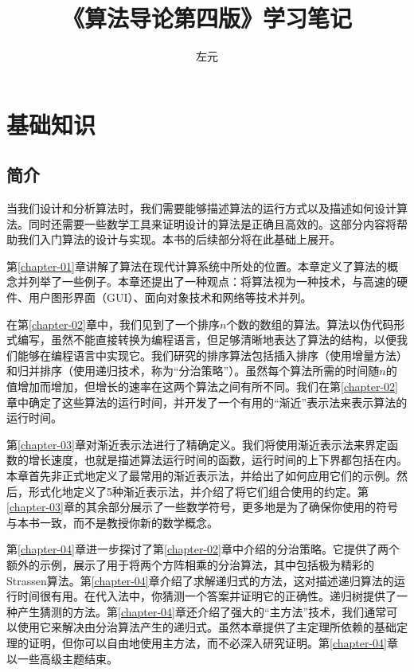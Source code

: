 \documentclass[lang=cn,newtx,10pt,scheme=chinese]{elegantbook}
\title{《算法导论第四版》学习笔记}
\author{左元}
\begin{document}
\maketitle
\frontmatter

\tableofcontents

\mainmatter

\part{基础知识}

\chapter*{简介}

当我们设计和分析算法时，我们需要能够描述算法的运行方式以及描述如何设计算法。同时还需要一些数学工具来证明设计的算法是正确且高效的。这部分内容将帮助我们入门算法的设计与实现。本书的后续部分将在此基础上展开。

第\ref{chapter-01}章讲解了算法在现代计算系统中所处的位置。本章定义了算法的概念并列举了一些例子。本章还提出了一种观点：将算法视为一种技术，与高速的硬件、用户图形界面（GUI）、面向对象技术和网络等技术并列。

在第\ref{chapter-02}章中，我们见到了一个排序$n$个数的数组的算法。算法以伪代码形式编写，虽然不能直接转换为编程语言，但足够清晰地表达了算法的结构，以便我们能够在编程语言中实现它。我们研究的排序算法包括插入排序（使用增量方法）和归并排序（使用递归技术，称为``分治策略''）。虽然每个算法所需的时间随$n$的值增加而增加，但增长的速率在这两个算法之间有所不同。我们在第\ref{chapter-02}章中确定了这些算法的运行时间，并开发了一个有用的``渐近''表示法来表示算法的运行时间。

第\ref{chapter-03}章对渐近表示法进行了精确定义。我们将使用渐近表示法来界定函数的增长速度，也就是描述算法运行时间的函数，运行时间的上下界都包括在内。本章首先非正式地定义了最常用的渐近表示法，并给出了如何应用它们的示例。然后，形式化地定义了5种渐近表示法，并介绍了将它们组合使用的约定。第\ref{chapter-03}章的其余部分展示了一些数学符号，更多地是为了确保你使用的符号与本书一致，而不是教授你新的数学概念。

第\ref{chapter-04}章进一步探讨了第\ref{chapter-02}章中介绍的分治策略。它提供了两个额外的示例，展示了用于将两个方阵相乘的分治算法，其中包括极为精彩的Strassen算法。第\ref{chapter-04}章介绍了求解递归式的方法，这对描述递归算法的运行时间很有用。在代入法中，你猜测一个答案并证明它的正确性。递归树提供了一种产生猜测的方法。第\ref{chapter-04}章还介绍了强大的``主方法''技术，我们通常可以使用它来解决由分治算法产生的递归式。虽然本章提供了主定理所依赖的基础定理的证明，但你可以自由地使用主方法，而不必深入研究证明。第\ref{chapter-04}章以一些高级主题结束。
\end{document}
